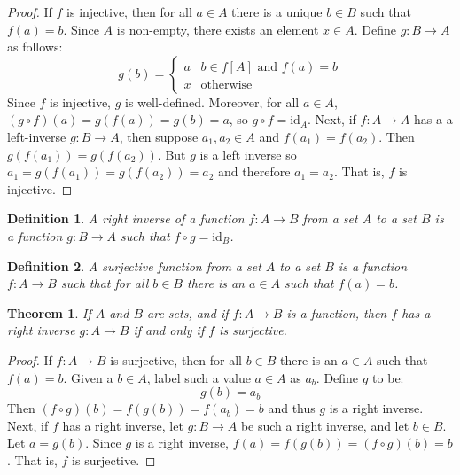 \documentclass{article}
\theoremstyle{plain}
\newtheorem{theorem}{Theorem}[section]
\theoremstyle{normal}
\newtheorem{definition}{Definition}[section]
\begin{document}
        \begin{proof}
            If $f$ is injective, then for all $a\in{A}$ there is a unique
            $b\in{B}$ such that $f(a)=b$. Since $A$ is non-empty, there exists
            an element $x\in{A}$. Define $g:B\rightarrow{A}$ as follows:
            \begin{equation}
                g(b)=
                \begin{cases}
                    a&b\in{f[A]}\textrm{ and }f(a)=b\\
                    x&\textrm{otherwise}
                \end{cases}
            \end{equation}
            Since $f$ is injective, $g$ is well-defined. Moreover, for all
            $a\in{A}$, $(g\circ{f})(a)=g(f(a))=g(b)=a$, so
            $g\circ{f}=\textrm{id}_{A}$. Next, if $f:A\rightarrow{A}$ has a
            a left-inverse $g:B\rightarrow{A}$, then suppose $a_{1},a_{2}\in{A}$
            and $f(a_{1})=f(a_{2})$. Then
            $g(f(a_{1}))=g(f(a_{2}))$. But $g$ is a left inverse so
            $a_{1}=g(f(a_{1}))=g(f(a_{2}))=a_{2}$ and therefore $a_{1}=a_{2}$.
            That is, $f$ is injective.
        \end{proof}
        \begin{definition}
            A right inverse of a function $f:A\rightarrow{B}$ from a set $A$ to
            a set $B$ is a function $g:B\rightarrow{A}$ such that
            $f\circ{g}=\textrm{id}_{B}$.
        \end{definition}
        \begin{definition}
            A surjective function from a set $A$ to a set $B$ is a function
            $f:A\rightarrow{B}$ such that for all $b\in{B}$ there is an
            $a\in{A}$ such that $f(a)=b$.
        \end{definition}
        \begin{theorem}
            If $A$ and $B$ are sets, and if $f:A\rightarrow{B}$ is a function,
            then $f$ has a right inverse $g:A\rightarrow{B}$ if and only if
            $f$ is surjective.
        \end{theorem}
        \begin{proof}
            If $f:A\rightarrow{B}$ is surjective, then for all $b\in{B}$ there
            is an $a\in{A}$ such that $f(a)=b$. Given a $b\in{A}$, label such
            a value $a\in{A}$ as $a_{b}$. Define $g$ to be:
            \begin{equation}
                g(b)=a_{b}
            \end{equation}
            Then $(f\circ{g})(b)=f(g(b))=f(a_{b})=b$ and thus $g$ is a right
            inverse. Next, if $f$ has a right inverse, let $g:B\rightarrow{A}$
            be such a right inverse, and let $b\in{B}$. Let $a=g(b)$. Since
            $g$ is a right inverse, $f(a)=f(g(b))=(f\circ{g})(b)=b$. That is,
            $f$ is surjective.
        \end{proof}
\end{document}
